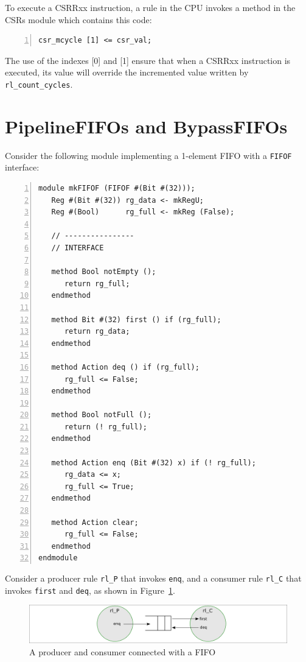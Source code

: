 To execute a CSRRxx instruction, a rule in the CPU invokes a method in
the CSRs module which contains this code:

{\footnotesize
\begin{Verbatim}[frame=single, numbers=left, label=from src\_Common/CSRs.bsv]
   csr_mcycle [1] <= csr_val;
\end{Verbatim}
}

The use of the indexes [0] and [1] ensure that when a CSRRxx
instruction is executed, its value will override the incremented value
written by \verb|rl_count_cycles|.


\section{PipelineFIFOs and BypassFIFOs}

\label{Sec_SpecialFIFOs}

Consider the following module implementing a 1-element FIFO with a
\verb|FIFOF| interface:

{\footnotesize
\begin{Verbatim}[frame=single, numbers=left]
module mkFIFOF (FIFOF #(Bit #(32)));
   Reg #(Bit #(32)) rg_data <- mkRegU;
   Reg #(Bool)      rg_full <- mkReg (False);

   // ----------------
   // INTERFACE

   method Bool notEmpty ();
      return rg_full;
   endmethod

   method Bit #(32) first () if (rg_full);
      return rg_data;
   endmethod

   method Action deq () if (rg_full);
      rg_full <= False;
   endmethod

   method Bool notFull ();
      return (! rg_full);
   endmethod

   method Action enq (Bit #(32) x) if (! rg_full);
      rg_data <= x;
      rg_full <= True;
   endmethod

   method Action clear;
      rg_full <= False;
   endmethod
endmodule
\end{Verbatim}
}

Consider a producer rule \verb|rl_P| that invokes \verb|enq|, and a
consumer rule \verb|rl_C| that invokes \verb|first| and \verb|deq|,
as shown in Figure~\ref{Fig_FIFO_Producer_Consumer}.
\begin{figure}[htbp]
  \centerline{\includegraphics[width=6in,angle=0]{Figures/Fig_FIFO_Producer_Consumer}}
  \caption{\label{Fig_FIFO_Producer_Consumer}A producer and consumer connected with a FIFO}
\end{figure}

